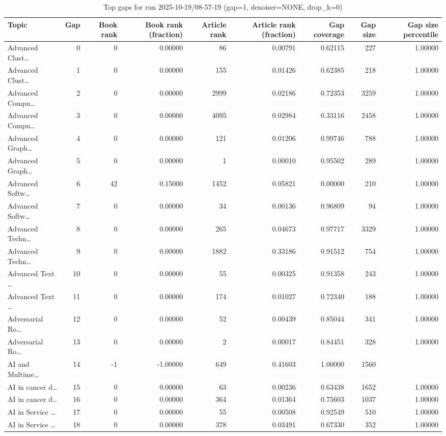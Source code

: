 \begin{table}
\caption{Top gaps for run 2025-10-19/08-57-19 (gap=1, denoiser=NONE, drop\_k=0)}
\label{tab:best_run_gap1_2025_10_19_08_57_19}
\begin{tabular}{lrrrrrrrr}
\toprule
Topic & Gap & Book rank & Book rank (fraction) & Article rank & Article rank (fraction) & Gap coverage & Gap size & Gap size percentile \\
\midrule
Advanced Clust… & 0 & 0 & 0.00000 & 86 & 0.00791 & 0.62115 & 227 & 1.00000 \\
Advanced Clust… & 1 & 0 & 0.00000 & 155 & 0.01426 & 0.62385 & 218 & 1.00000 \\
Advanced Compu… & 2 & 0 & 0.00000 & 2999 & 0.02186 & 0.72353 & 3259 & 1.00000 \\
Advanced Compu… & 3 & 0 & 0.00000 & 4095 & 0.02984 & 0.33116 & 2458 & 1.00000 \\
Advanced Graph… & 4 & 0 & 0.00000 & 121 & 0.01206 & 0.99746 & 788 & 1.00000 \\
Advanced Graph… & 5 & 0 & 0.00000 & 1 & 0.00010 & 0.95502 & 289 & 1.00000 \\
Advanced Softw… & 6 & 42 & 0.15000 & 1452 & 0.05821 & 0.00000 & 210 & 1.00000 \\
Advanced Softw… & 7 & 0 & 0.00000 & 34 & 0.00136 & 0.96809 & 94 & 1.00000 \\
Advanced Techn… & 8 & 0 & 0.00000 & 265 & 0.04673 & 0.97717 & 3329 & 1.00000 \\
Advanced Techn… & 9 & 0 & 0.00000 & 1882 & 0.33186 & 0.91512 & 754 & 1.00000 \\
Advanced Text … & 10 & 0 & 0.00000 & 55 & 0.00325 & 0.91358 & 243 & 1.00000 \\
Advanced Text … & 11 & 0 & 0.00000 & 174 & 0.01027 & 0.72340 & 188 & 1.00000 \\
Adversarial Ro… & 12 & 0 & 0.00000 & 52 & 0.00439 & 0.85044 & 341 & 1.00000 \\
Adversarial Ro… & 13 & 0 & 0.00000 & 2 & 0.00017 & 0.84451 & 328 & 1.00000 \\
AI and Multime… & 14 & -1 & -1.00000 & 649 & 0.41603 & 1.00000 & 1560 &  \\
AI in cancer d… & 15 & 0 & 0.00000 & 63 & 0.00236 & 0.63438 & 1652 & 1.00000 \\
AI in cancer d… & 16 & 0 & 0.00000 & 364 & 0.01364 & 0.75603 & 1037 & 1.00000 \\
AI in Service … & 17 & 0 & 0.00000 & 55 & 0.00508 & 0.92549 & 510 & 1.00000 \\
AI in Service … & 18 & 0 & 0.00000 & 378 & 0.03491 & 0.67330 & 352 & 1.00000 \\

\end{tabular}
\end{table}
